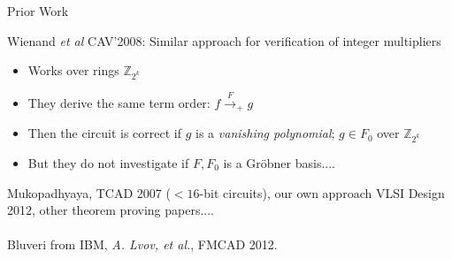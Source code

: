\documentclass[xcolor=dvipsnames]{beamer}
\begin{document}




%



\begin{frame}{Prior Work}

Wienand {\it et al} CAV'2008: Similar approach for verification
  of integer multipliers
\begin{itemize}
\item Works over rings $\mathbb{Z}_{2^k}$
\item They derive the same term order: $f\stackrel{F}
  {\textstyle\longrightarrow}_+ g$
\item Then the circuit is correct if $g$ is a {\it vanishing
    polynomial}; $g \in F_0$ over $\mathbb{Z}_{2^k}$
\item But they do not investigate if $F, F_0$ is a Gr\"obner basis....
\end{itemize}
Mukopadhyaya, TCAD 2007 ($<16$-bit circuits), our own approach VLSI
Design 2012, other theorem proving papers....\\

\ \\
{\sc Bluveri} from IBM,  {\it A. Lvov, et al.}, FMCAD 2012.
\end{frame}
\end{document}
